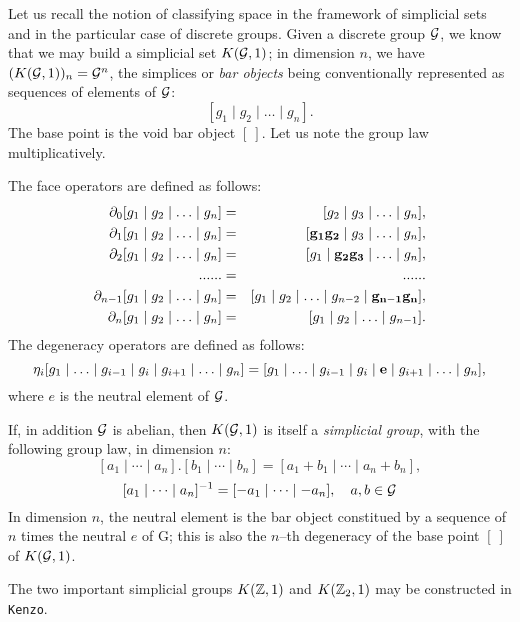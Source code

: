 Let us recall the notion of classifying space in the framework of simplicial sets and
in the particular case of discrete groups. Given a discrete group $\cal G$, we know that we may build a
simplicial set $K({\cal G}, 1)$; in dimension $n$, we have $(K({\cal G}, 1))_n = {\cal G}^n$,
the simplices or {\em bar objects} being  conventionally represented  as sequences of elements of $\cal G$:
$$ [g_1 \mid g_2 \mid \ldots \mid g_n]. $$
The base point is the void bar object $[\ ]$. 
Let us note the group law multiplicatively.
\par
The face operators are defined as follows: 
\begin{eqnarray*}
\partial_0 [g_1 \mid g_2 \mid \ldots \mid g_n] & = & [g_2 \mid g_3 \mid \ldots \mid g_n], \\
\partial_1 [g_1 \mid g_2 \mid \ldots \mid g_n] & = & [{\bf g_1g_2} \mid g_3 \mid \ldots \mid g_n], \\
\partial_2 [g_1 \mid g_2 \mid \ldots \mid g_n] & = & [g_1 \mid {\bf g_2g_3} \mid \ldots \mid g_n], \\
                        ......                & = &  ......  \\
\partial_{n-1} [g_1 \mid g_2 \mid \ldots \mid g_n] & = & [g_1 \mid g_2 \mid \ldots \mid g_{n-2} \mid {\bf g_{n-1}g_n}], \\
\partial_n [g_1 \mid g_2 \mid \ldots \mid g_n] & = & [g_1 \mid g_2 \mid \ldots \mid g_{n-1}].
\end{eqnarray*}
The degeneracy operators are defined as follows:
$$ \eta_i [g_1 \mid \ldots \mid g_{i-1} \mid g_i \mid g_{i+1} \mid \ldots \mid g_n] =
          [g_1 \mid \ldots \mid g_{i-1}  \mid g_i \mid {\bf e} \mid g_{i+1} \mid \ldots \mid g_n],$$
where $e$ is the neutral element of $\cal G$. 
\par
If, in addition $\cal G$ is abelian, then  $K({\cal G}, 1)$ is itself a {\em simplicial group}, with the
following group law, in dimension $n$:
$$[a_1  \mid \cdots \mid a_n] . [b_1 \mid \cdots \mid b_n] = [a_1+b_1 \mid \cdots \mid a_n+b_n], $$
$$[a_1  \mid \cdots \mid a_n]^{-1}= [-a_1  \mid \cdots \mid -a_n],\quad a,b \in {\cal G}$$
In dimension $n$, the neutral element is the bar object constitued by a sequence of $n$ times the neutral $e$ of {\cal G};
this is also the $n$--th degeneracy of the base point $[\ ]$ of $K({\cal G}, 1)$.
\par
The two important simplicial groups $K({{\Bbb Z}}, 1)$ and $K({{\Bbb Z}}_2, 1)$ may be cons\-truc\-ted in {\tt Kenzo}.
\vskip 0.30cm
